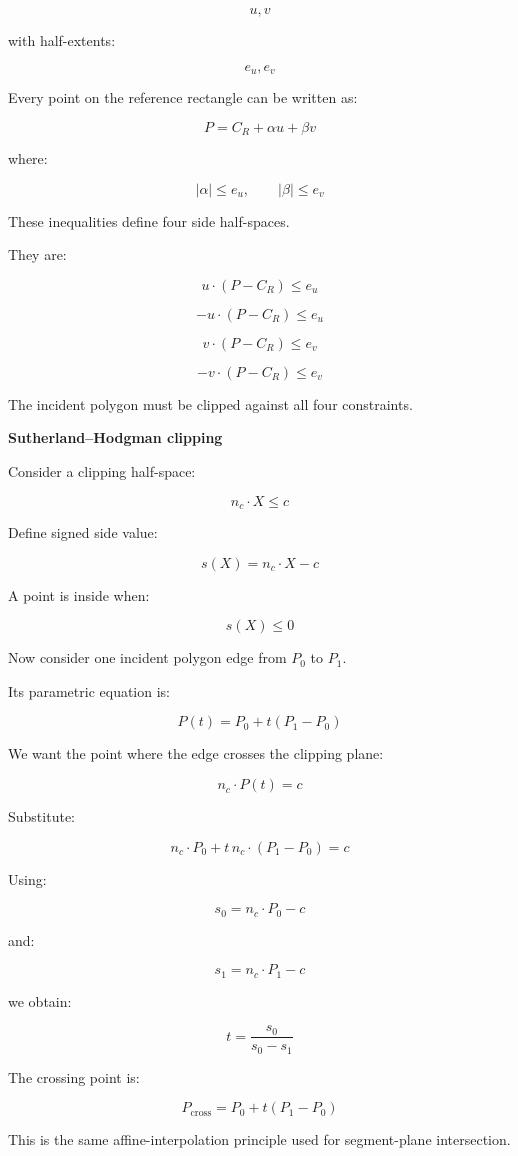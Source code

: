 \[
u,v
\]

with half-extents:

\[
e_u,e_v
\]

Every point on the reference rectangle can be written as:

\[
\boxed{ P=C_R+\alpha u+\beta v }
\]

where:

\[
|\alpha|\le e_u,\qquad|\beta|\le e_v
\]

These inequalities define four side half-spaces.

They are:

\[
\boxed{ u\cdot(P-C_R)\le e_u }
\]

\[
\boxed{ -u\cdot(P-C_R)\le e_u }
\]

\[
\boxed{ v\cdot(P-C_R)\le e_v }
\]

\[
\boxed{ -v\cdot(P-C_R)\le e_v }
\]

The incident polygon must be clipped against all four constraints.

\textbf{Sutherland--Hodgman clipping}

Consider a clipping half-space:

\[
\boxed{ n_c\cdot X\le c }
\]

Define signed side value:

\[
s(X)=n_c\cdot X-c
\]

A point is inside when:

\[
s(X)\le0
\]

Now consider one incident polygon edge from \(P_0\) to \(P_1\).

Its parametric equation is:

\[
P(t)=P_0+t(P_1-P_0)
\]

We want the point where the edge crosses the clipping plane:

\[
n_c\cdot P(t)=c
\]

Substitute:

\[
n_c\cdot P_0+t\,n_c\cdot(P_1-P_0)=c
\]

Using:

\[
s_0=n_c\cdot P_0-c
\]

and:

\[
s_1=n_c\cdot P_1-c
\]

we obtain:

\[
\boxed{ t=\frac{s_0}{s_0-s_1} }
\]

The crossing point is:

\[
\boxed{ P_{\mathrm{cross}}= P_0+t(P_1-P_0) }
\]

This is the same affine-interpolation principle used for segment-plane intersection.

